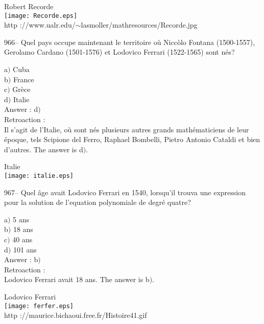﻿\documentclass[letterpaper, 12pt]{article}
\begin{document}
        \begin{center}
        Robert Recorde\\
    \texttt{[image: Recorde.eps]}\\
        {\footnotesize http
://www.ualr.edu/$\sim$lasmoller/mathresources/Recorde.jpg}
    \end{center}

966-- Quel pays occupe maintenant le territoire o\`u Nicc\`olo
Fontana (1500-1557), Gerolamo Cardano (1501-1576) et Lodovico
Ferrari (1522-1565) sont n\'es?

a$)$ Cuba \\
b$)$ France  \\
c$)$ Gr\`ece \\
d$)$ Italie \\

Answer : d$)$\\

Retroaction : \\
Il s'agit de l'Italie, o\`u sont n\'es plusieurs autres grands
math\'ematiciens de leur \'epoque, tels Scipione del Ferro, Raphael
Bombelli, Pietro Antonio Cataldi et bien d'autres. The answer is
d$)$.

        \begin{center}
        Italie\\
    \texttt{[image: italie.eps]}\\
    \end{center}

967-- Quel \^age avait Lodovico Ferrari en 1540, lorsqu'il trouva
une expression pour la solution de l'equation polynomiale de
degr\'e quatre?

a$)$ 5 ans \\
b$)$ 18 ans  \\
c$)$ 40 ans \\
d$)$ 101 ans \\

Answer : b$)$\\

Retroaction : \\
Lodovico Ferrari avait 18 ans. The answer is b$)$.\\

        \begin{center}
        Lodovico Ferrari\\
    \texttt{[image: ferfer.eps]}\\
        {\footnotesize http ://maurice.bichaoui.free.fr/Histoire41.gif}
    \end{center}
\end{document}
